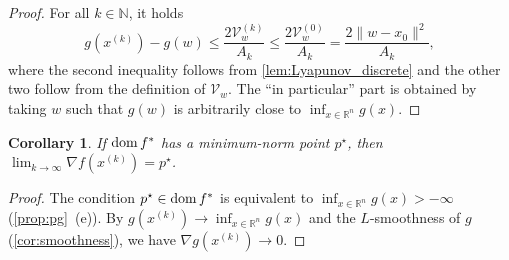 \documentclass[11pt,a4paper]{article}
\theoremstyle{definition}
\theoremstyle{plain}
\newtheorem{cor}[cor]{Corollary}
\newcommand{\RR}{{\mathbb{R}}}
\newcommand{\NN}{{\mathbb{N}}}
\newcommand{\dom}{\mathop{\rm dom}}
\begin{document}
\begin{proof}
    For all $k \in \NN$, it holds
    \[
        g\left(x^{(k)}\right) - g(w) \le \frac{2\mathcal{V}_w^{(k)}}{A_k} \le \frac{2\mathcal{V}_w^{(0)}}{A_k} = \frac{2\|w - x_0\|^2}{A_k},
    \]
    where the second inequality follows from \cref{lem:Lyapunov_discrete} and the other two follow from the definition of $\mathcal{V}_w$.
    The ``in particular'' part is obtained by taking $w$ such that $g(w)$ is arbitrarily close to $\inf_{x \in \RR^n}g(x)$.
\end{proof}
\begin{cor}
    If $\dom f^\ast$ has a minimum-norm point $p^\star$, then $\lim_{k \to \infty}\nabla f\left(x^{(k)}\right) = p^\star$.
\end{cor}
\begin{proof}
    The condition $p^\star \in \dom f^\ast$ is equivalent to $\inf_{x \in \RR^n}g(x) > -\infty$ (\cref{prop:pg}~(e)).
    By $g\left(x^{(k)}\right) \to \inf_{x \in \RR^n}g(x)$ and the $L$-smoothness of $g$ (\cref{cor:smoothness}), we have $\nabla g\left(x^{(k)}\right) \to 0$.
\end{proof}
\end{document}
